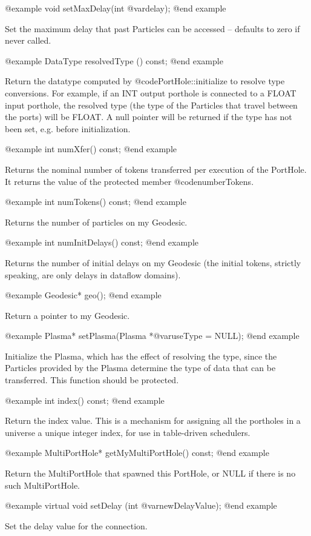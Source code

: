 @example
void setMaxDelay(int @var{delay});
@end example

Set the maximum delay that past Particles can be accessed -- defaults to
zero if never called.

@example
DataType resolvedType () const;
@end example

Return the datatype computed by @code{PortHole::initialize} to resolve
type conversions.  For example, if an INT output porthole is connected
to a FLOAT input porthole, the resolved type (the type of the Particles
that travel between the ports) will be FLOAT.  A null pointer will be
returned if the type has not been set, e.g. before initialization.

@example
int numXfer() const;
@end example

Returns the nominal number of tokens transferred per execution of the
PortHole.  It returns the value of the protected member @code{numberTokens}.

@example
int numTokens() const;
@end example

Returns the number of particles on my Geodesic.

@example
int numInitDelays() const;
@end example

Returns the number of initial delays on my Geodesic (the initial tokens,
strictly speaking, are only delays in dataflow domains).

@example
Geodesic* geo();
@end example

Return a pointer to my Geodesic.

@example
Plasma* setPlasma(Plasma *@var{useType} = NULL);
@end example

Initialize the Plasma, which has the effect of resolving the type, since
the Particles provided by the Plasma determine the type of data that can
be transferred.  This function should be protected.

@example
int index() const;
@end example

Return the index value.  This is a mechanism for assigning all the
portholes in a universe a unique integer index, for use in table-driven
schedulers.

@example
MultiPortHole* getMyMultiPortHole() const;
@end example

Return the MultiPortHole that spawned this PortHole, or NULL
if there is no such MultiPortHole.

@example
virtual void setDelay (int @var{newDelayValue});
@end example

Set the delay value for the connection.

